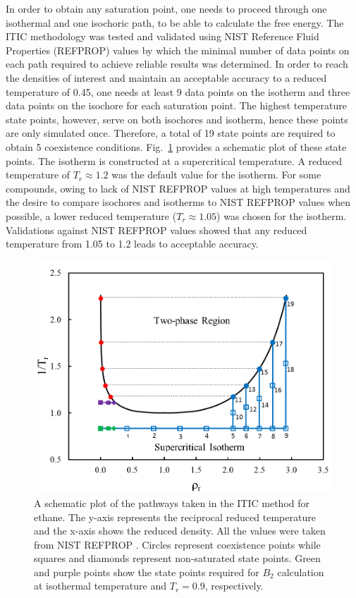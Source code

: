 \documentclass[%
 aip,
 jcp,
 sd,%
 amsmath,amssymb,
 reprint,%
]{revtex4-1}
\begin{document}
In order to obtain any saturation point, one needs to proceed through one isothermal and one isochoric path, to be able to calculate the free energy. The ITIC methodology was tested and validated using NIST Reference Fluid Properties (REFPROP) \cite{LEMMON-RP91} values by which the minimal number of data points on each path required to achieve reliable results was determined. In order to reach the densities of interest and maintain an acceptable accuracy to a reduced temperature of 0.45, one needs at least 9 data points on the isotherm and three data points on the isochore for each saturation point. The highest temperature state points, however, serve on both isochores and isotherm, hence these points are only simulated once. Therefore, a total of 19 state points are required to obtain 5 coexistence conditions. Fig.~\ref{fig:ITICpathway} provides a schematic plot of these state points. The isotherm is constructed at a supercritical temperature. A reduced temperature of $T_{r} \approx 1.2$ was the default value for the isotherm. For some compounds, owing to lack of NIST REFPROP values at high temperatures and the desire to compare isochores and isotherms to NIST REFPROP values when possible, a lower reduced temperature ($T_{r} \approx 1.05$) was chosen for the isotherm. Validations against NIST REFPROP values showed that any reduced temperature from 1.05 to 1.2 leads to acceptable accuracy.

\begin{figure}
\includegraphics[scale=0.5]{Figures/ITIC-pathway-C2.png}
\caption{A schematic plot of the pathways taken in the ITIC method for ethane. The y-axis represents the reciprocal reduced temperature and the x-axis shows the reduced density. All the values were taken from NIST REFPROP \cite{Bucker2006}. Circles represent coexistence points while squares and diamonds represent non-saturated state points. Green and purple points show the state points required for $B_2$ calculation at isothermal temperature and $T_r=0.9$, respectively. }
\label{fig:ITICpathway}
\end{figure}
\end{document}
